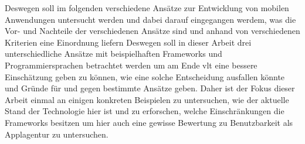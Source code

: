 Deswegen soll im folgenden verschiedene Ansätze zur Entwicklung von mobilen Anwendungen untersucht werden und dabei darauf eingegangen werdem, was die Vor- und Nachteile der verschiedenen Ansätze sind und anhand von verschiedenen Kriterien eine Einordnung liefern
Deswegen soll in dieser Arbeit drei unterschiedliche Ansätze mit beispielhaften Frameworks und Programmiersprachen betrachtet werden um am Ende vlt eine bessere Einschätzung geben zu können, wie eine solche Entscheidung ausfallen könnte und Gründe für und gegen bestimmte Ansätze geben.
Daher ist der Fokus dieser Arbeit einmal an einigen konkreten Beispielen zu untersuchen, wie der aktuelle Stand der Technologie hier ist und zu erforschen, welche Einschränkungen die Frameworks besitzen um hier auch eine gewisse Bewertung zu Benutzbarkeit als Applagentur zu untersuchen.

